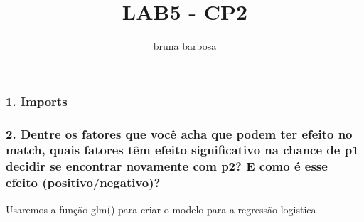 \documentclass[]{article}
\title{LAB5 - CP2}
\author{bruna barbosa}
\date{}
\newenvironment{Shaded}{\begin{snugshade}}{\end{snugshade}}
\newcommand{\KeywordTok}[1]{\textcolor[rgb]{0.13,0.29,0.53}{\textbf{{#1}}}}
\newcommand{\DataTypeTok}[1]{\textcolor[rgb]{0.13,0.29,0.53}{{#1}}}
\newcommand{\DecValTok}[1]{\textcolor[rgb]{0.00,0.00,0.81}{{#1}}}
\newcommand{\StringTok}[1]{\textcolor[rgb]{0.31,0.60,0.02}{{#1}}}
\newcommand{\NormalTok}[1]{{#1}}
\begin{document}
\maketitle

\subsubsection{1. Imports}\label{imports}

\begin{Shaded}
\end{Shaded}

\subsubsection{2. Dentre os fatores que você acha que podem ter efeito
no match, quais fatores têm efeito significativo na chance de p1 decidir
se encontrar novamente com p2? E como é esse efeito
(positivo/negativo)?}\label{dentre-os-fatores-que-voce-acha-que-podem-ter-efeito-no-match-quais-fatores-tem-efeito-significativo-na-chance-de-p1-decidir-se-encontrar-novamente-com-p2-e-como-e-esse-efeito-positivonegativo}

Usaremos a função glm() para criar o modelo para a regressão logistica
\end{document}
